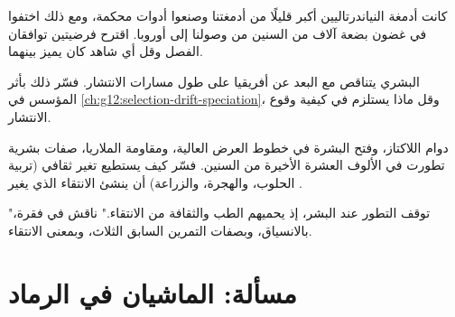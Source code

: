 \begin{exercise}[$\star\star\star$]\label{exo:g12:human-evolution:12}
كانت أدمغة النياندرتاليين أكبر قليلًا من أدمغتنا وصنعوا أدوات محكمة،
ومع ذلك اختفوا في غضون بضعة آلاف من السنين من وصولنا إلى أوروبا. اقترح
فرضيتين توافقان الفصل وقل أي شاهد كان يميز بينهما.
\end{exercise}

\begin{exercise}[$\star\star\star$]\label{exo:g12:human-evolution:13}
 البشري يتناقص مع البعد عن أفريقيا على طول مسارات
الانتشار. فسّر ذلك بأثر المؤسس في
\cref{ch:g12:selection-drift-speciation}، وقل ماذا يستلزم في كيفية
وقوع الانتشار.
\end{exercise}

\begin{exercise}[$\star\star\star$]\label{exo:g12:human-evolution:14}
دوام اللاكتاز، وفتح البشرة في خطوط العرض العالية، ومقاومة الملاريا،
صفات بشرية تطورت في الألوف العشرة الأخيرة من السنين. فسّر كيف يستطيع
تغير ثقافي (تربية الحلوب، والهجرة، والزراعة) أن ينشئ الانتقاء الذي
يغير .
\end{exercise}

\begin{exercise}[$\star\star\star$]\label{exo:g12:human-evolution:15}
"توقف التطور عند البشر، إذ يحميهم الطب والثقافة من الانتقاء." ناقش في
فقرة، بالانسياق، وبصفات التمرين السابق الثلاث، وبمعنى الانتقاء.
\end{exercise}

\section{مسألة: الماشيان في الرماد}

